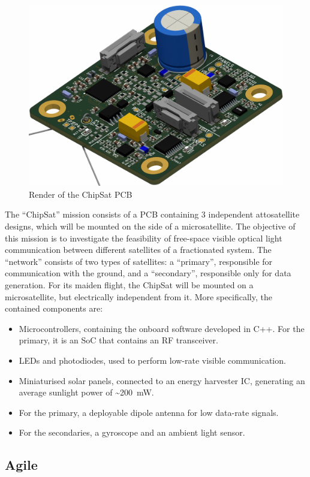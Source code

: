 \documentclass[]{iac}
\begin{document}
\begin{figure}[h]
    \centering
    \includegraphics[width=.6\linewidth]{media/img0913.png}
    \caption{Render of the ChipSat PCB}
    \label{fig:chipsat}
\end{figure}

 The ``ChipSat'' mission consists of a \acs{PCB} containing 3 independent attosatellite designs, which will be mounted on the side of a microsatellite. The objective of this mission is to investigate the feasibility of free-space visible optical light communication between different satellites of a fractionated system. The ``network'' consists of two types of satellites: a ``primary'', responsible for communication with the ground, and a ``secondary'', responsible only for data generation. For its maiden flight, the ChipSat will be mounted on a microsatellite, but electrically independent from it.  More specifically, the contained components are:
 \begin{itemize}[itemsep=0pt]
     \item Microcontrollers, containing the onboard software developed in C++. For the primary, it is an \acs{SoC} that contains an \acs{RF} transceiver.
     \item LEDs and photodiodes, used to perform low-rate visible communication.
     \item Miniaturised solar panels, connected to an energy harvester \acs{IC}, generating an average sunlight power of \textasciitilde\SI{200}{\milli\watt}.
     \item For the primary, a deployable dipole antenna for low data-rate signals.
     \item For the secondaries, a gyroscope and an ambient light sensor.
 \end{itemize}

 

 

\subsection{Agile}
\label{sec:agilee}
\end{document}
